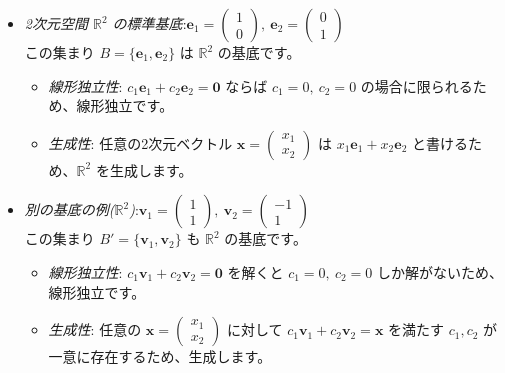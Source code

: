 \begin{ex}
\begin{itemize}
\item \emph{2次元空間 $\mathbb{R}^2$ の標準基底}:$\bm{e}_1 = \begin{pmatrix} 1 \\ 0 \end{pmatrix},\ \bm{e}_2 = \begin{pmatrix} 0 \\ 1 \end{pmatrix}$\\
	この集まり $B = \{\bm{e}_1, \bm{e}_2\}$ は $\mathbb{R}^2$ の基底です。
	\begin{itemize}
	\item \emph{線形独立性}: $c_1 \bm{e}_1 + c_2 \bm{e}_2 = \bm{0}$ ならば $c_1=0,\ c_2=0$ の場合に限られるため、線形独立です。
    \item \emph{生成性}: 任意の2次元ベクトル $\bm{x} = \begin{pmatrix} x_1 \\ x_2 \end{pmatrix}$ は $x_1 \bm{e}_1 + x_2 \bm{e}_2$ と書けるため、$\mathbb{R}^2$ を生成します。
    \end{itemize}
\item \emph{別の基底の例($\mathbb{R}^2$)}:$\bm{v}_1 = \begin{pmatrix} 1 \\ 1 \end{pmatrix},\ \bm{v}_2 = \begin{pmatrix} -1 \\ 1 \end{pmatrix}$\\
    この集まり $B' = \{\bm{v}_1, \bm{v}_2\}$ も $\mathbb{R}^2$ の基底です。
	\begin{itemize}
    \item \emph{線形独立性}: $c_1 \bm{v}_1 + c_2 \bm{v}_2 = \bm{0}$ を解くと $c_1=0,\ c_2=0$ しか解がないため、線形独立です。
    \item \emph{生成性}: 任意の $\bm{x} = \begin{pmatrix} x_1 \\ x_2 \end{pmatrix}$ に対して $c_1 \bm{v}_1 + c_2 \bm{v}_2 = \bm{x}$ を満たす $c_1, c_2$ が一意に存在するため、生成します。
    \end{itemize}
\end{itemize}
\end{ex}

